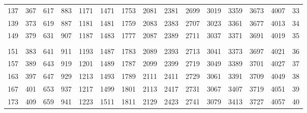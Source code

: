 \begin{tabular}{rrrrrrrrrrrrrr@{\;\;\vrule width \heavyrulewidth\;}r}
 137 &  367 &  617 &  883 & 1171 & 1471 & 1753 & 2081 & 2381 & 2699 & 3019 & 3359 & 3673 & 4007 &   33\\
 139 &  373 &  619 &  887 & 1181 & 1481 & 1759 & 2083 & 2383 & 2707 & 3023 & 3361 & 3677 & 4013 &   34\\
 149 &  379 &  631 &  907 & 1187 & 1483 & 1777 & 2087 & 2389 & 2711 & 3037 & 3371 & 3691 & 4019 &   35\\
&&&&&&&&&&&&&&\\
 151 &  383 &  641 &  911 & 1193 & 1487 & 1783 & 2089 & 2393 & 2713 & 3041 & 3373 & 3697 & 4021 &   36\\
 157 &  389 &  643 &  919 & 1201 & 1489 & 1787 & 2099 & 2399 & 2719 & 3049 & 3389 & 3701 & 4027 &   37\\
 163 &  397 &  647 &  929 & 1213 & 1493 & 1789 & 2111 & 2411 & 2729 & 3061 & 3391 & 3709 & 4049 &   38\\
 167 &  401 &  653 &  937 & 1217 & 1499 & 1801 & 2113 & 2417 & 2731 & 3067 & 3407 & 3719 & 4051 &   39\\
 173 &  409 &  659 &  941 & 1223 & 1511 & 1811 & 2129 & 2423 & 2741 & 3079 & 3413 & 3727 & 4057 &   40\\
\bottomrule
\end{tabular}

\twocolumn

